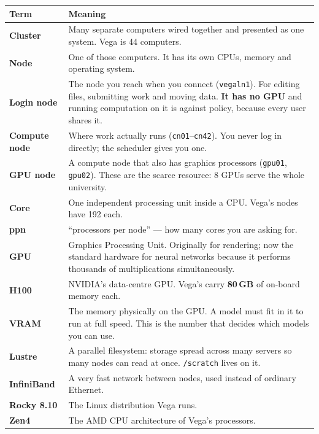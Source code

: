 \documentclass[11pt,a4paper]{article}
\begin{document}
\begin{longtable}{@{}>{\raggedright\arraybackslash}p{3.5cm} p{11.6cm}@{}}
\toprule
\textbf{Term} & \textbf{Meaning} \\
\midrule
\endhead
\textbf{Cluster} & Many separate computers wired together and presented as one
system. Vega is 44 computers. \\
\textbf{Node} & One of those computers. It has its own CPUs, memory and
operating system. \\
\textbf{Login node} & The node you reach when you connect
(\texttt{vegaln1}). For editing files, submitting work and moving data.
\textbf{It has no GPU} and running computation on it is against policy, because
every user shares it. \\
\textbf{Compute node} & Where work actually runs (\texttt{cn01}--\texttt{cn42}).
You never log in directly; the scheduler gives you one. \\
\textbf{GPU node} & A compute node that also has graphics processors
(\texttt{gpu01}, \texttt{gpu02}). These are the scarce resource: 8 GPUs serve the
whole university. \\
\textbf{Core} & One independent processing unit inside a CPU. Vega's nodes have
192 each. \\
\textbf{ppn} & ``processors per node'' --- how many cores you are asking for. \\
\textbf{GPU} & Graphics Processing Unit. Originally for rendering; now the
standard hardware for neural networks because it performs thousands of
multiplications simultaneously. \\
\textbf{H100} & NVIDIA's data-centre GPU. Vega's carry \textbf{80\,GB} of
on-board memory each. \\
\textbf{VRAM} & The memory physically on the GPU. A model must fit in it to run
at full speed. This is the number that decides which models you can use. \\
\textbf{Lustre} & A parallel filesystem: storage spread across many servers so
many nodes can read at once. \texttt{/scratch} lives on it. \\
\textbf{InfiniBand} & A very fast network between nodes, used instead of
ordinary Ethernet. \\
\textbf{Rocky 8.10} & The Linux distribution Vega runs. \\
\textbf{Zen4} & The AMD CPU architecture of Vega's processors. \\
\bottomrule
\end{longtable}
\end{document}
